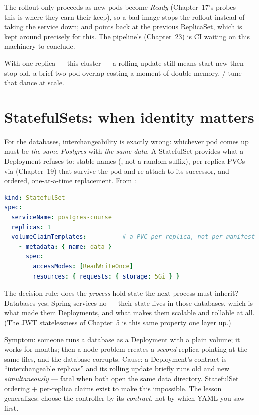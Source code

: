 The rollout only proceeds as new pods become \emph{Ready}
(Chapter~17's probes --- this is where they earn their keep), so a bad
image stops the rollout instead of taking the service down; and
 points back at the previous ReplicaSet,
which is kept around precisely for this. The pipeline's
 (Chapter~23) is CI waiting on this
machinery to conclude.

With one replica --- this cluster --- a rolling update still means
start-new-then-stop-old, a brief two-pod overlap costing a moment of
double memory. / tune that dance at
scale.

\section{StatefulSets: when identity matters}

For the databases, interchangeability is exactly wrong: whichever pod
comes up must be \emph{the same Postgres} with \emph{the same data}. A
StatefulSet provides what a Deployment refuses to: stable names
(, not a random suffix), per-replica PVCs via
 (Chapter~19) that survive the pod and
re-attach to its successor, and ordered, one-at-a-time replacement.
From :

\begin{lstlisting}[language=yaml]
kind: StatefulSet
spec:
  serviceName: postgres-course
  replicas: 1
  volumeClaimTemplates:          # a PVC per replica, not per manifest
    - metadata: { name: data }
      spec:
        accessModes: [ReadWriteOnce]
        resources: { requests: { storage: 5Gi } }
\end{lstlisting}

The decision rule: does the \emph{process} hold state the next process
must inherit? Databases yes; Spring services no --- their state lives in
those databases, which is what made them Deployments, and what makes
them scalable and rollable at all. (The JWT statelessness of
Chapter~5 is this same property one layer up.)

\begin{pitfall}
Symptom: someone runs a database as a Deployment with a plain volume; it
works for months; then a node problem creates a \emph{second} replica
pointing at the same files, and the database corrupts. Cause: a
Deployment's contract is ``interchangeable replicas'' and its rolling
update briefly runs old and new \emph{simultaneously} --- fatal when
both open the same data directory. StatefulSet ordering + per-replica
claims exist to make this impossible. The lesson generalizes: choose
the controller by its \emph{contract}, not by which YAML you saw first.
\end{pitfall}

